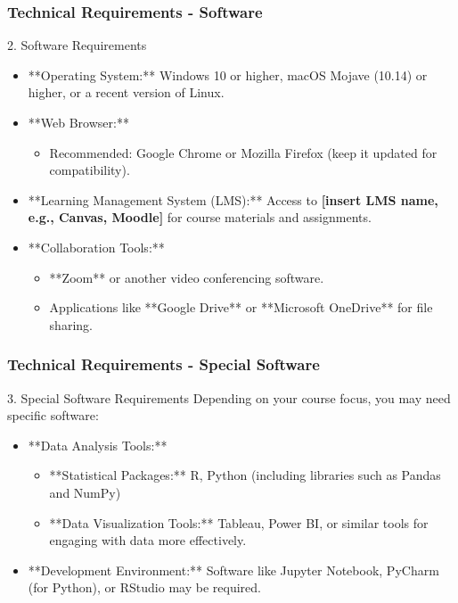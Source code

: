 \documentclass[aspectratio=169]{beamer}
\begin{document}
\begin{frame}[fragile]
    \frametitle{Technical Requirements - Software}
    \begin{block}{2. Software Requirements}
        \begin{itemize}
            \item **Operating System:** Windows 10 or higher, macOS Mojave (10.14) or higher, or a recent version of Linux.
            \item **Web Browser:**
                \begin{itemize}
                    \item Recommended: Google Chrome or Mozilla Firefox (keep it updated for compatibility).
                \end{itemize}
            \item **Learning Management System (LMS):** Access to \textbf{[insert LMS name, e.g., Canvas, Moodle]} for course materials and assignments.
            \item **Collaboration Tools:**
                \begin{itemize}
                    \item **Zoom** or another video conferencing software.
                    \item Applications like **Google Drive** or **Microsoft OneDrive** for file sharing.
                \end{itemize}
        \end{itemize}
    \end{block}
\end{frame}

\begin{frame}[fragile]
    \frametitle{Technical Requirements - Special Software}
    \begin{block}{3. Special Software Requirements}
        Depending on your course focus, you may need specific software:
        \begin{itemize}
            \item **Data Analysis Tools:**
                \begin{itemize}
                    \item **Statistical Packages:** R, Python (including libraries such as Pandas and NumPy)
                    \item **Data Visualization Tools:** Tableau, Power BI, or similar tools for engaging with data more effectively.
                \end{itemize}
            \item **Development Environment:** Software like Jupyter Notebook, PyCharm (for Python), or RStudio may be required.
        \end{itemize}
    \end{block}
\end{frame}
\end{document}
